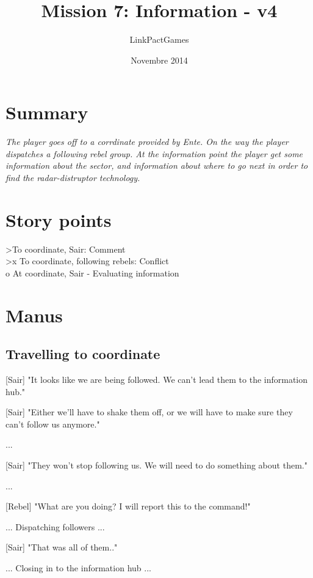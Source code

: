 \documentclass[a4paper,12pt]{article}
\begin{document}
\title{Mission 7: Information - v4}
\author{LinkPactGames}
\date{Novembre 2014}
\maketitle

\section{Summary}

\textit{The player goes off to a corrdinate provided by Ente. On the way the player dispatches a following rebel group.
At the information point the player get some information about the sector, and information about where to go next
in order to find the radar-distruptor technology.}

\section{Story points}

\textgreater To coordinate, Sair: Comment\\
\textgreater x To coordinate, following rebels: Conflict\\
o At coordinate, Sair - Evaluating information

\section{Manus}

\subsection{Travelling to coordinate}

[Sair] "It looks like we are being followed. We can't lead them to the information hub." 

[Sair] "Either we'll have to shake them off, or we will have to make sure they can't follow us anymore."

...

[Sair] "They won't stop following us. We will need to do something about them."

...

[Rebel] "What are you doing? I will report this to the command!"

... Dispatching followers ...

[Sair] "That was all of them.."

... Closing in to the information hub ...
\end{document}
